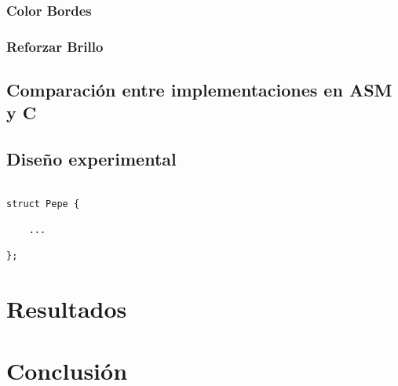 \documentclass[a4paper]{article}
\newenvironment{codesnippet}{%
	\begin{Sbox}\begin{minipage}{\textwidth}\sffamily\small}%
	{\end{minipage}\end{Sbox}%
		\begin{center}%
		\vspace{-0.4cm}\colorbox{litegrey}{\TheSbox}\end{center}\vspace{0.3cm}}
\begin{document}
\subsubsection{Color Bordes}

\subsubsection{Reforzar Brillo}


\subsection{Comparación entre implementaciones en ASM y C}

\subsection{Diseño experimental}

\begin{codesnippet}
\begin{verbatim}

struct Pepe {

    ...

};

\end{verbatim}
\end{codesnippet}


\section{Resultados}
%

\section{Conclusión}
\end{document}
